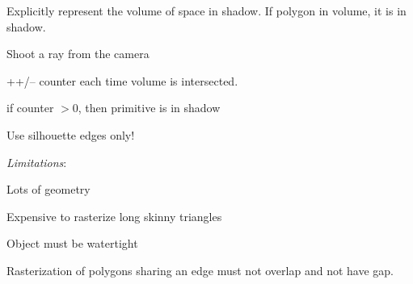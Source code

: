   \begin{compactenum}
    \item Explicitly represent the volume of space in shadow. If polygon in volume, it is in shadow.
    \begin{compactenum}
      \item Shoot a ray from the camera
      \item ++/-- counter each time volume is intersected.
      \item if counter \(> 0\), then primitive is in shadow
    \end{compactenum}
  
    \item Use silhouette edges only!
  
    \item \textit{Limitations}:
    \begin{compactenum}
        \item Lots of geometry
        \item Expensive to rasterize long skinny triangles
        \item Object must be watertight
        \item Rasterization of polygons sharing an edge must not overlap and not have gap.
    \end{compactenum}
\end{compactenum}
   
